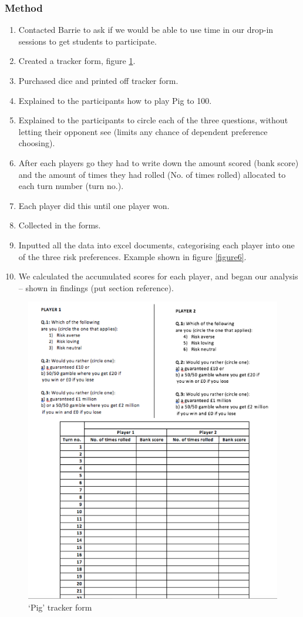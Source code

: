 \documentclass[a4paper,titlepage]{article}
\begin{document}
\subsubsection{Method}
\begin{enumerate}
\item Contacted Barrie to ask if we would be able to use time in our drop-in sessions to get students to participate.
\item Created a tracker form, figure \ref{figure5}.
\item Purchased dice and printed off tracker form.
\item Explained to the participants how to play Pig to 100.
\item Explained to the participants to circle each of the three questions, without letting their opponent see (limits any chance of dependent preference choosing).
\item After each players go they had to write down the amount scored (bank score) and the amount of times they had rolled (No. of times rolled) allocated to each turn number (turn no.).
\item Each player did this until one player won.
\item Collected in the forms.
\item Inputted all the data into excel documents, categorising each player into one of the three risk preferences. Example shown in figure \ref{figure6}.
\item We calculated the accumulated scores for each player, and began our analysis – shown in findings (put section reference).
\end{enumerate}
\begin{figure}
\center
\includegraphics[scale=1]{pig_tracker_form}
\caption{`Pig' tracker form\label{figure5}}
\end{figure}
\end{document}
